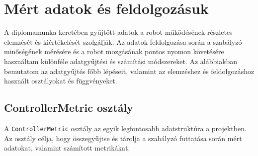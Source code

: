\section{Mért adatok és feldolgozásuk}
A diplomamunka keretében gyűjtött adatok a robot működésének részletes elemzését és kiértékelését szolgálják. Az adatok feldolgozása során a szabályzó minőségének mérésére és a robot mozgásának pontos nyomon követésére használtam különféle adatgyűjtési és számítási módszereket. Az alábbiakban bemutatom az adatgyűjtés főbb lépéseit, valamint az elemzéshez és feldolgozáshoz használt osztályokat és függvényeket.

\subsection{ControllerMetric osztály}
A \texttt{ControllerMetric} osztály az egyik legfontosabb adatstruktúra a projektben. Az osztály célja, hogy összegyűjtse és tárolja a szabályzó futtatása során mért adatokat, valamint számított metrikákat.
